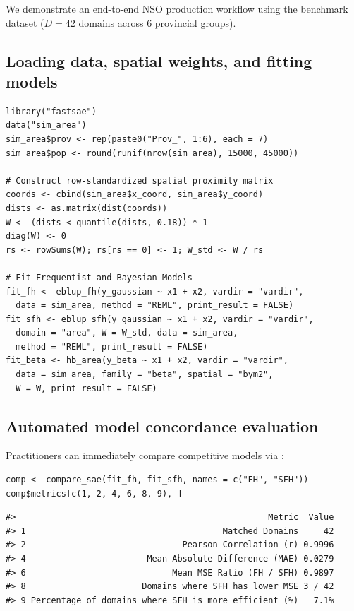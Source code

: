 We demonstrate an end-to-end NSO production workflow using the benchmark dataset  (\(D = 42\) domains across 6 provincial groups).

\subsection{Loading data, spatial weights, and fitting models}

\begin{verbatim}
library("fastsae")
data("sim_area")
sim_area$prov <- rep(paste0("Prov_", 1:6), each = 7)
sim_area$pop <- round(runif(nrow(sim_area), 15000, 45000))

# Construct row-standardized spatial proximity matrix
coords <- cbind(sim_area$x_coord, sim_area$y_coord)
dists <- as.matrix(dist(coords))
W <- (dists < quantile(dists, 0.18)) * 1
diag(W) <- 0
rs <- rowSums(W); rs[rs == 0] <- 1; W_std <- W / rs

# Fit Frequentist and Bayesian Models
fit_fh <- eblup_fh(y_gaussian ~ x1 + x2, vardir = "vardir",
  data = sim_area, method = "REML", print_result = FALSE)
fit_sfh <- eblup_sfh(y_gaussian ~ x1 + x2, vardir = "vardir",
  domain = "area", W = W_std, data = sim_area,
  method = "REML", print_result = FALSE)
fit_beta <- hb_area(y_beta ~ x1 + x2, vardir = "vardir",
  data = sim_area, family = "beta", spatial = "bym2",
  W = W, print_result = FALSE)
\end{verbatim}

\subsection{Automated model concordance evaluation}

Practitioners can immediately compare competitive models via :

\begin{verbatim}
comp <- compare_sae(fit_fh, fit_sfh, names = c("FH", "SFH"))
comp$metrics[c(1, 2, 4, 6, 8, 9), ]
\end{verbatim}

\begin{verbatim}
#>                                                  Metric  Value
#> 1                                       Matched Domains     42
#> 2                               Pearson Correlation (r) 0.9996
#> 4                        Mean Absolute Difference (MAE) 0.0279
#> 6                             Mean MSE Ratio (FH / SFH) 0.9897
#> 8                       Domains where SFH has lower MSE 3 / 42
#> 9 Percentage of domains where SFH is more efficient (%)   7.1%
\end{verbatim}

